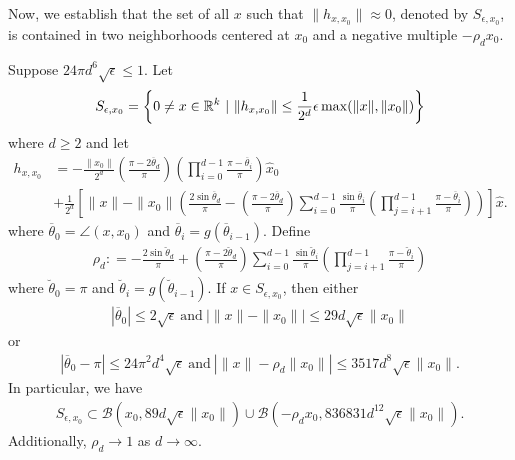 \documentclass{article}
\begin{document}
Now, we establish that the set of all $x$ such that $\|h_{x,x_0}\| \approx 0$, denoted by $S_{\epsilon,x_0}$, is contained in two neighborhoods centered at $x_0$ and a negative multiple $-\rho_d x_0$.

\begin{prop} Suppose $24\pi d^6\sqrt{\epsilon}\leq 1.$ Let \begin{align*}
S_{\epsilon,x_0} = \left\{0 \neq x \in \mathbb{R}^k\ |\ \|h_{x,x_0}\| \leq \frac{1}{2^d}\epsilon \max(\|x\|,\|x_0\|)\right\}
\end{align*} where $d \geq 2$ and let 
\begin{align*}
h_{x,x_0} & = - \frac{\|x_0\|}{2^d}\left(\frac{\pi - 2\overline{\theta}_d}{\pi}\right)\left(\prod_{i=0}^{d-1}\frac{\pi - \overline{\theta}_i}{\pi}\right)\hat{x}_0 \\
& + \frac{1}{2^d}\left[\|x\| - \|x_0\|\left( \frac{2\sin \overline{\theta}_d}{\pi} - \left(\frac{\pi - 2\overline{\theta}_d}{\pi}\right) \sum_{i=0}^{d-1} \frac{\sin \overline{\theta}_i}{\pi}\left(\prod_{j=i+1}^{d-1} \frac{\pi - \overline{\theta}_i}{\pi}\right)\right)\right]\hat{x}.
\end{align*} where $\overline{\theta}_0 = \angle(x,x_0)$ and $\overline{\theta}_i = g(\overline{\theta}_{i-1})$. Define \begin{align*}
\rho_d : = - \frac{2 \sin \breve{\theta}_d}{\pi} + \left(\frac{\pi - 2 \breve{\theta}_d}{\pi}\right) \sum_{i=0}^{d-1}\frac{\sin \breve{\theta}_i}{\pi} \left(\prod_{j=i+1}^{d-1} \frac{\pi - \breve{\theta}_i}{\pi}\right)
\end{align*} where $\breve{\theta}_0 = \pi$ and $\breve{\theta}_i = g(\breve{\theta}_{i-1})$. If $x \in S_{\epsilon,x_0}$, then either \begin{align*}
|\overline{\theta}_0| \leq 2\sqrt{\epsilon}\ \text{and}\ |\|x\| - \|x_0\|| \leq 29d\sqrt{\epsilon}\|x_0\|
\end{align*} or \begin{align*}
|\overline{\theta}_0 - \pi|\leq 24\pi^2d^4\sqrt{\epsilon}\ \text{and}\ |\|x\| - \rho_d\|x_0\|| \leq 3517d^8\sqrt{\epsilon}\|x_0\|.
\end{align*} In particular, we have 
\begin{align*}
S_{\epsilon,x_0} \subset \mathcal{B}(x_0,89d\sqrt{\epsilon}\|x_0\|) \cup \mathcal{B}(-\rho_d x_0, 836831d^{12}\sqrt{\epsilon}\|x_0\|).
\end{align*} Additionally, $\rho_d \rightarrow 1$ as $d \rightarrow \infty$.
\end{prop}
\end{document}

